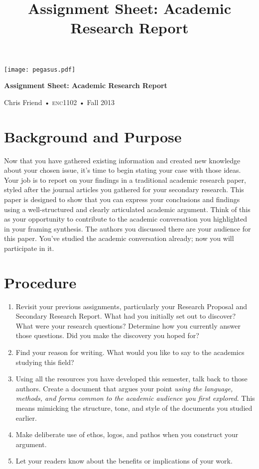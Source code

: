 \documentclass[10pt,oneside]{amsart}	%
\title[Academic Research Report]{Assignment Sheet: Academic Research Report}
\begin{document}
%
\thispagestyle{empty}

\vspace{-2in}
\begin{center}
\huge
\texttt{[image: pegasus.pdf]}

\textbf{Assignment Sheet: Academic Research Report}

{\normalsize Chris Friend • \textsc{enc1102} • Fall 2013}
\end{center}
\vspace{1.5\baselineskip}

\section{Background and Purpose} %
\label{sec:background}
Now that you have gathered existing information and created new knowledge about your chosen issue, it's time to begin stating your case with those ideas. Your job is to report on your findings in a traditional academic research paper, styled after the journal articles you gathered for your secondary research. This paper is designed to show that you can express your conclusions and findings using a well-structured and clearly articulated academic argument. Think of this as your opportunity to contribute to the academic conversation you highlighted in your framing synthesis. The authors you discussed there are your audience for this paper. You've studied the academic conversation already; now you will participate in it.

\section{Procedure} %
\label{sec:procedure}
\begin{enumerate}
	\item Revisit your previous assignments, particularly your Research Proposal and Secondary Research Report. What had you initially set out to discover? What were your research questions? Determine how you currently answer those questions. Did you make the discovery you hoped for?
	\item Find your reason for writing. What would you like to say to the academics studying this field?
	\item Using all the resources you have developed this semester, talk back to those authors. Create a document that argues your point \emph{using the language, methods, and forms common to the academic audience you first explored}. This means mimicking the structure, tone, and style of the documents you studied earlier.
	\item Make deliberate use of ethos, logos, and pathos when you construct your argument.
	\item Let your readers know about the benefits or implications of your work.
\end{enumerate}
\end{document}
